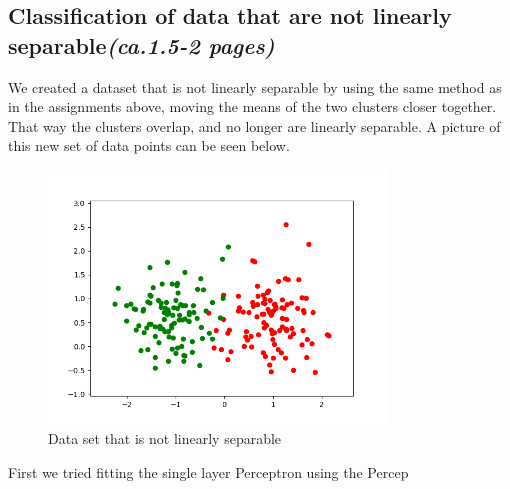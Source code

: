 \documentclass[a4paper]{article}
\begin{document}
\subsection{Classification of data that are not linearly separable\textit{(ca.1.5-2 pages)}}
We created a dataset that is not linearly separable by using the same method as in the assignments above, moving the means of the two clusters closer together. That way the clusters overlap, and no longer are linearly separable. A picture of this new set of data points can be seen below.
\begin{figure}[htb]
    \centering
    \includegraphics[width=0.8\textwidth]{Labs/Lab 1/Lab 1a/Results/overlapping_dataset.png}
    \caption{Data set that is not linearly separable}
    \label{fig:enter-label}
\end{figure}
First we tried fitting the single layer Perceptron using the Percep
\end{document}
